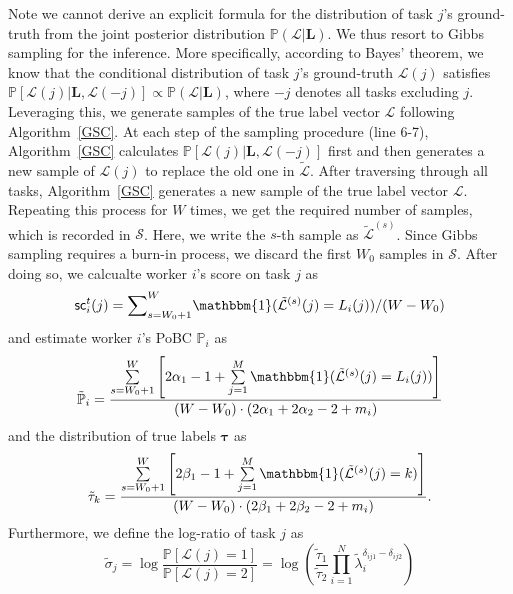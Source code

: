 Note we cannot derive an explicit formula for the distribution of task $j$'s ground-truth from the joint posterior distribution $\mathbb{P}(\mathcal{L}|\bm{L})$. We thus resort to Gibbs sampling for the inference.
More specifically, according to Bayes' theorem, we know that the conditional distribution of task $j$'s ground-truth $\mathcal{L}(j)$ satisfies
$\mathbb{P}[\mathcal{L}(j)|\bm{L}, \mathcal{L}(-j)]\propto \mathbb{P}(\mathcal{L}|\bm{L})$, where $-j$ denotes all tasks excluding $j$.
Leveraging this, we generate samples of the true label vector $\mathcal{L}$ following Algorithm~\ref{GSC}.
At each step of the sampling procedure (line 6-7), Algorithm~\ref{GSC} calculates $\mathbb{P}[\mathcal{L}(j)|\bm{L}, \mathcal{L}(-j)]$ first and then generates a new sample of $\mathcal{L}(j)$ to replace the old one in $\tilde{\mathcal{L}}$.
After traversing through all tasks, Algorithm~\ref{GSC} generates a new sample of the true label vector $\mathcal{L}$.
Repeating this process for $W$ times, we get the required number of samples, which is recorded in $\mathcal{S}$.
Here, we write the $s$-th sample as $\tilde{\mathcal{L}}^{(s)}$.
Since Gibbs sampling requires a burn-in process, we discard the first $W_0$ samples in $\mathcal{S}$. After doing so, we calcualte worker $i$'s score on task $j$ as
\begin{equation}
\label{equaton:score}
\textsf{sc}^{t}_i(j) = {\sum}_{s=W_0+1}^{W}\mathbbm{1}(\tilde{\mathcal{L}}^{(s)}(j)=L_{i}(j))/(W-W_0)
\end{equation}
and estimate worker $i$'s PoBC $\mathbb{P}_i$ as
\begin{equation}
\label{equation:p_infer}
\tilde{\mathbb{P}}_{i}=\frac{\sum\limits_{s=W_0+1}^{W}\left[2\alpha_{1}-1+\sum\limits_{j=1}^{M}\mathbbm{1}(\tilde{\mathcal{L}}^{(s)}(j)=L_{i}(j))\right]}{(W-W_0)\cdot(2\alpha_{1}+2\alpha_{2}-2+m_i)}
\end{equation}
and the distribution of true labels $\bm{\tau}$ as
\begin{equation}
\label{tau_infer}
\tilde{\tau}_{k}=\frac{\sum\limits_{s=W_0+1}^{W}\left[2\beta_{1}-1+\sum\limits_{j=1}^{M}\mathbbm{1}(\tilde{\mathcal{L}}^{(s)}(j)=k)\right]}{(W-W_0)\cdot(2\beta_{1}+2\beta_{2}-2+m_i)}.
\end{equation}
Furthermore, we define the log-ratio of task $j$ as
\begin{equation}
\label{ProbRatio}
\tilde{\sigma}_j=\log\frac{\mathbb{P}[\mathcal{L}(j)=1]}{\mathbb{P}[\mathcal{L}(j)=2]}=\log\left(\frac{\tilde{\tau}_1}{\tilde{\tau}_2}\prod_{i=1}^{N}\tilde{\lambda}_i^{\delta_{ij1}-\delta_{ij2}}\right)
\end{equation}
